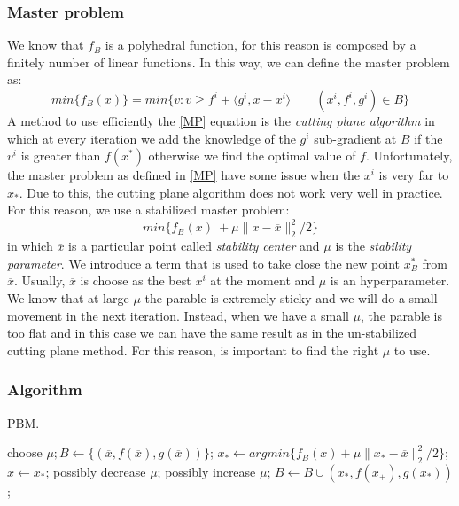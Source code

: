 \subsubsection{Master problem}
We know that $f_B$ is a polyhedral function, for this reason is composed by a finitely number of linear functions.
In this way, we can define the master problem as:
\begin{equation}
\label{MP}
min\{f_B(x)\} = min\{v : v \geq f^i + \langle g^i, x-x^i \rangle \qquad (x^i, f^i, g^i) \in B \}
\end{equation} 
A method to use efficiently the \ref{MP} equation is the \textit{cutting plane algorithm} in which at every iteration we add the knowledge of the $g^i$ sub-gradient at $B$ if the $v^i$ is greater than $f(x^*)$ otherwise we find the optimal value of $f$.  
Unfortunately, the master problem as defined in \ref{MP} have some issue when the $x^i$ is very far to $x_*$. Due to this, the cutting plane algorithm does not work very well in practice.
For this reason, we use a stabilized master problem: 
\begin{equation}
\label{SMP}
min\{f_B(x)\ + \mu \parallel x- \overline{x}\parallel_{2}^2/2 \}
\end{equation} 
in which $\overline{x}$ is a particular point called \textit{stability center} and $\mu$ is the \textit{stability parameter}. We introduce a term that is used to take close the new point $x^*_B$ from $\overline{x}$.
Usually, $\overline{x}$ is choose as the best $x^i$ at the moment and $\mu$ is an hyperparameter.
We know that at large $\mu$ the parable is extremely sticky and we will do a small movement in the next iteration.
Instead, when we have a small $\mu$, the parable is too flat and in this case we can have the same result as in the un-stabilized cutting plane method. For this reason, is important to find the right $\mu$ to use.
\subsubsection{Algorithm}

\begin{algorithm}[H]
	\caption{PBM.}
	\label{alg:PBM}
	\begin{algorithmic}[4]
		\State choose $\mu; B \leftarrow \{(\overline{x},f( \overline{x}),g(\overline{x}) )\}$;
		\Repeat
		\State $x_*\leftarrow argmin\{f_B(x) +\mu \parallel x_* - \overline{x}\parallel^2_2/2\}$;
		\State $ x \leftarrow x_* $; possibly decrease $ \mu $;
		\Else possibly increase $\mu$;
		\EndIf
		\State $B \leftarrow B 	\cup (x_*,f(x_+),g(x_*) )$;
		\EndProcedure 
	\end{algorithmic}
\end{algorithm}

